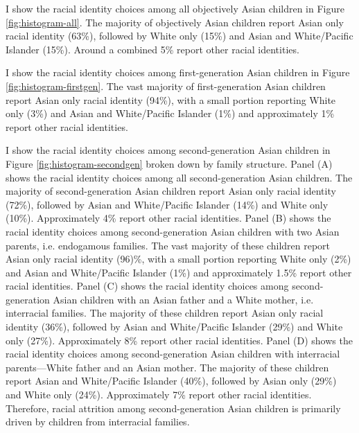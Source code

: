 I show the racial identity choices among all objectively Asian children in Figure \ref{fig:histogram-all}. The majority of objectively Asian children report Asian only racial identity (63\%), followed by White only (15\%) and Asian and White/Pacific Islander (15\%). Around a combined 5\% report other racial identities. 

I show the racial identity choices among first-generation Asian children in Figure \ref{fig:histogram-firstgen}. The vast majority of first-generation Asian children report Asian only racial identity (94\%), with a small portion reporting White only (3\%) and Asian and White/Pacific Islander (1\%) and approximately 1\% report other racial identities.

I show the racial identity choices among second-generation Asian children in Figure \ref{fig:histogram-secondgen} broken down by family structure. Panel (A) shows the racial identity choices among all second-generation Asian children. The majority of second-generation Asian children report Asian only racial identity (72\%), followed by Asian and White/Pacific Islander (14\%) and White only (10\%). Approximately 4\% report other racial identities. Panel (B) shows the racial identity choices among second-generation Asian children with two Asian parents, i.e. endogamous families. The vast majority of these children report Asian only racial identity (96)\%, with a small portion reporting White only (2\%) and Asian and White/Pacific Islander (1\%) and approximately 1.5\% report other racial identities. Panel (C) shows the racial identity choices among second-generation Asian children with an Asian father and a White mother, i.e. interracial families. The majority of these children report Asian only racial identity (36\%), followed by Asian and White/Pacific Islander (29\%) and White only (27\%). Approximately 8\% report other racial identities. Panel (D) shows the racial identity choices among second-generation Asian children with interracial parents---White father and an Asian mother. The majority of these children report Asian and White/Pacific Islander (40\%), followed by Asian only (29\%) and White only (24\%). Approximately 7\% report other racial identities. Therefore, racial attrition among second-generation Asian children is primarily driven by children from interracial families.


